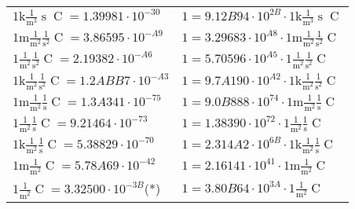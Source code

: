 \begin{center}
\begin{longtable}{l l}
{\color{gray}$1 \bm{\mathrm{ k}}\frac1{\operatorname{m}^3}{\operatorname{s}}{\operatorname{C}}{} = 1.39981\cdot10^{-30} $}   & {\color{gray}$ 1 = 9.12B94\cdot10^{2B} \cdot 1 \bm{\mathrm{ k}}\frac1{\operatorname{m}^3}{\operatorname{s}}{\operatorname{C}}{}$}  \\
{\color{gray}$1 \bm{\mathrm{ m}}\frac1{\operatorname{m}^2}\frac1{\operatorname{s}^2}{\operatorname{C}}{} = 3.86595\cdot10^{-A9} $}   & {\color{gray}$ 1 = 3.29683\cdot10^{A8} \cdot 1 \bm{\mathrm{ m}}\frac1{\operatorname{m}^2}\frac1{\operatorname{s}^2}{\operatorname{C}}{}$}  \\
{\color{black}$1 \bm{\mathrm{ }}\frac1{\operatorname{m}^2}\frac1{\operatorname{s}^2}{\operatorname{C}}{} = 2.19382\cdot10^{-A6} $}   & {\color{black}$ 1 = 5.70596\cdot10^{A5} \cdot 1 \bm{\mathrm{ }}\frac1{\operatorname{m}^2}\frac1{\operatorname{s}^2}{\operatorname{C}}{}$}  \\
{\color{gray}$1 \bm{\mathrm{ k}}\frac1{\operatorname{m}^2}\frac1{\operatorname{s}^2}{\operatorname{C}}{} = 1.2ABB7\cdot10^{-A3} $}   & {\color{gray}$ 1 = 9.7A190\cdot10^{A2} \cdot 1 \bm{\mathrm{ k}}\frac1{\operatorname{m}^2}\frac1{\operatorname{s}^2}{\operatorname{C}}{}$}  \\
{\color{gray}$1 \bm{\mathrm{ m}}\frac1{\operatorname{m}^2}\frac1{\operatorname{s}}{\operatorname{C}}{} = 1.3A341\cdot10^{-75} $}   & {\color{gray}$ 1 = 9.0B888\cdot10^{74} \cdot 1 \bm{\mathrm{ m}}\frac1{\operatorname{m}^2}\frac1{\operatorname{s}}{\operatorname{C}}{}$}  \\
{\color{black}$1 \bm{\mathrm{ }}\frac1{\operatorname{m}^2}\frac1{\operatorname{s}}{\operatorname{C}}{} = 9.21464\cdot10^{-73} $}   & {\color{black}$ 1 = 1.38390\cdot10^{72} \cdot 1 \bm{\mathrm{ }}\frac1{\operatorname{m}^2}\frac1{\operatorname{s}}{\operatorname{C}}{}$}  \\
{\color{gray}$1 \bm{\mathrm{ k}}\frac1{\operatorname{m}^2}\frac1{\operatorname{s}}{\operatorname{C}}{} = 5.38829\cdot10^{-70} $}   & {\color{gray}$ 1 = 2.314A2\cdot10^{6B} \cdot 1 \bm{\mathrm{ k}}\frac1{\operatorname{m}^2}\frac1{\operatorname{s}}{\operatorname{C}}{}$}  \\
{\color{gray}$1 \bm{\mathrm{ m}}\frac1{\operatorname{m}^2}{}{\operatorname{C}}{} = 5.78A69\cdot10^{-42} $}   & {\color{gray}$ 1 = 2.16141\cdot10^{41} \cdot 1 \bm{\mathrm{ m}}\frac1{\operatorname{m}^2}{}{\operatorname{C}}{}$}  \\
{\color{black}$1 \bm{\mathrm{ }}\frac1{\operatorname{m}^2}{}{\operatorname{C}}{} = 3.32500\cdot10^{-3B} $}\quad(*) & {\color{black}$ 1 = 3.80B64\cdot10^{3A} \cdot 1 \bm{\mathrm{ }}\frac1{\operatorname{m}^2}{}{\operatorname{C}}{}$}  \\

\end{longtable}
\end{center}
